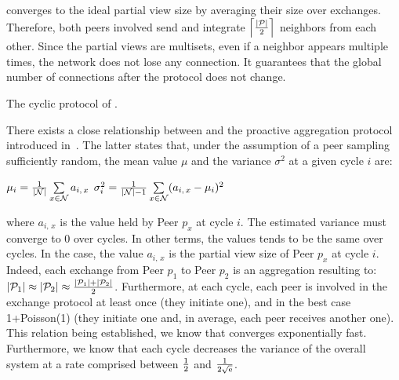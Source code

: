 \SCAMPLON{} converges to the ideal partial view size by averaging their size
over exchanges. Therefore, both peers involved send and integrate
$\left\lceil|\mathcal{P}|\over{2}\right\rceil$ neighbors from each
other. Since the partial views are multisets, even if a neighbor appears
multiple times, the network does not lose any connection. It guarantees that
the global number of connections after the protocol does not change.

\begin{algorithm}[h] %
  
  \caption{\label{algo:scamplon}The cyclic protocol of \SCAMPLON{}.}
\end{algorithm}

There exists a close relationship between \SCAMPLON{} and the proactive
aggregation protocol introduced
in~\cite{jelasity2004epidemic,montresor2004robust}. The latter states that,
under the assumption of a peer sampling sufficiently random, the mean value
$\mu$ and the variance $\sigma^2$ at a given cycle $i$ are:
\begin{center}
  $\mu_i = {1\over{|\mathcal{N}|}} \sum\limits_{x \in \mathcal{N}} a_{i,\,x}$
  \hfill
  $\sigma^2_i = {1\over{|\mathcal{N}|-1}}\sum\limits_{x \in \mathcal{N}}
  (a_{i,\,x} - \mu_i)^2$
\end{center}
where $a_{i,\,x}$ is the value held by Peer $p_x$ at cycle $i$. The estimated
variance must converge to $0$ over cycles. In other terms, the values tends to
be the same over cycles. In the \SCAMPLON{} case, the value $a_{i,\,x}$ is the
partial view size of Peer $p_x$ at cycle $i$. Indeed, each exchange from Peer
$p_1$ to Peer $p_2$ is an aggregation resulting to:
$|\mathcal{P}_1|\approx|\mathcal{P}_2|\approx{|\mathcal{P}_1| + |\mathcal{P}_2|
  \over{2}}$.
Furthermore, at each cycle, each peer is involved in the exchange protocol at
least once (they initiate one), and in the best case 1+Poisson(1) (they
initiate one and, in average, each peer receives another one). This
relation being established, we know that \SCAMPLON{} converges exponentially
fast. Furthermore, we know that each cycle decreases the variance of the
overall system at a rate comprised between ${1\over{2}}$ and
$1\over{2\sqrt{\text{e}}}$.


